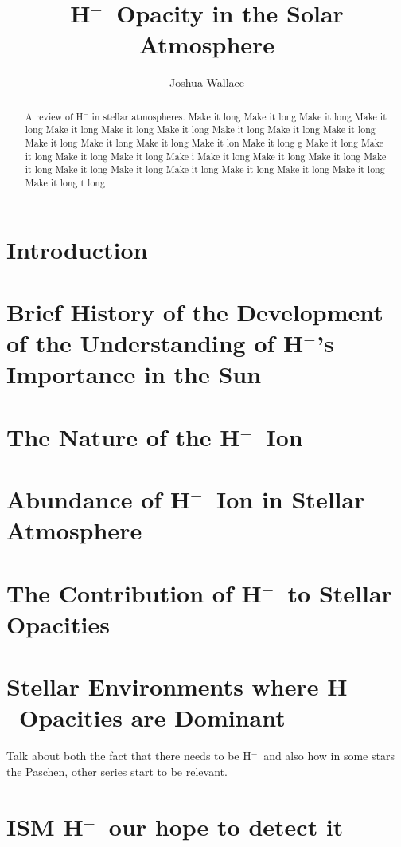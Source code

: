 \documentclass{emulateapj}
\def\h{H$^-$}
\begin{document}
\title{\h\ Opacity in the Solar Atmosphere}

\author{Joshua Wallace}


\begin{abstract}
A review of H$^-$ in stellar atmospheres. Make it long  Make it long  Make it long  Make it long  Make it long  Make it long  Make it long  Make it long  Make it long  Make it long  Make it long  Make it long  Make it long  Make it lon Make it long g  Make it long  Make it long  Make it long  Make it long  Make i Make it long  Make it long  Make it long  Make it long  Make it long  Make it long  Make it long  Make it long  Make it long  Make it long  Make it long t long 
\end{abstract}


\section{Introduction}


\section{Brief History of the Development of the Understanding of \h's Importance in the Sun}


\section{The Nature of the \h\ Ion}


\section{Abundance of \h\ Ion in Stellar Atmosphere}


\section{The Contribution of \h\ to Stellar Opacities}


\section{Stellar Environments where \h\ Opacities are Dominant}
Talk about both the fact that there needs to be \h\ and also how in
some stars the Paschen, other series start to be relevant.

\section{ISM \h\, our hope to detect it}



\end{document}
